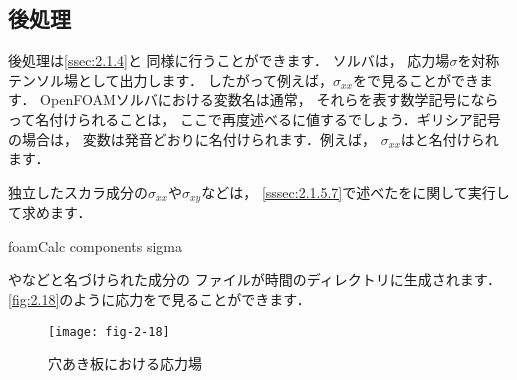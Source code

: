\subsection{後処理}
\label{ssec:2.2.3}
後処理は\autoref{ssec:2.1.4}と
同様に行うことができます．
ソルバは，
応力場$\sigma$を対称テンソル場として出力します．
したがって例えば，$\sigma_{xx}$をで見ることができます．
OpenFOAMソルバにおける変数名は通常，
それらを表す数学記号にならって名付けられることは，
ここで再度述べるに値するでしょう．ギリシア記号の場合は，
変数は発音どおりに名付けられます．例えば，
$\sigma_{xx}$はと名付けられます．

独立したスカラ成分の$\sigma_{xx}$や$\sigma_{xy}$などは，
\autoref{sssec:2.1.5.7}で述べたをに関して実行して求めます．
\begin{OFverbatim}[terminal]
foamCalc components sigma
\end{OFverbatim}
やなどと名づけられた成分の
ファイルが時間のディレクトリに生成されます．
\autoref{fig:2.18}のように応力をで見ることができます．


\begin{figure}[ht]
 \texttt{[image: fig-2-18]}
 \caption{穴あき板における応力場}
 \label{fig:2.18}
\end{figure}


